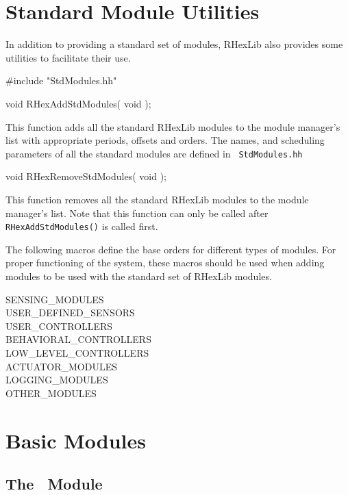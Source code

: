 \section{Standard Module Utilities}

In addition to providing a standard set of modules, RHexLib also provides
some utilities to facilitate their use.

\begin{codesegment}
#include "StdModules.hh"
\end{codesegment}

\begin{prototype}
void RHexAddStdModules( void );
\end{prototype}

This function adds all the standard RHexLib modules to the module manager's
list with appropriate periods, offsets and orders. The names, and
scheduling parameters of all the standard modules are defined in {\tt
  StdModules.hh}

\begin{prototype}
void RHexRemoveStdModules( void );
\end{prototype}

This function removes all the standard RHexLib modules to the module manager's
list. Note that this function can only be called after {\tt
  RHexAddStdModules()} is called first.


The following macros define the base orders for different types of
modules. For proper functioning of the system, these macros should be used
when adding modules to be used with the standard set of RHexLib modules.

\begin{datatype}
SENSING\_MODULES \\
USER\_DEFINED\_SENSORS \\
USER\_CONTROLLERS \\
BEHAVIORAL\_CONTROLLERS \\
LOW\_LEVEL\_CONTROLLERS \\
ACTUATOR\_MODULES \\
LOGGING\_MODULES \\
OTHER\_MODULES \\
\end{datatype}

\section{Basic Modules}

\subsection{The \EncoderReader\ Module}

